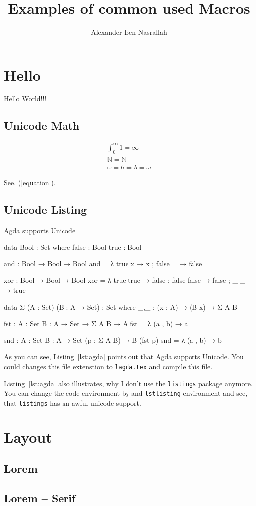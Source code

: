 \documentclass[titlepage,12pt]{article}
\author{Alexander Ben Nasrallah}
\title{Examples of common used Macros}
\begin{document}
\maketitle


\toc{}

\section{Hello}
Hello World!!!

\subsection{Unicode Math}
\begin{align}
	∫_0^∞ 1 = ∞ \\
	\mathbb{N} = ℕ \label{equation} \\
	ω = b ⇔ b = ω
\end{align}

See. (\ref{equation}).

\subsection{Unicode Listing}
\begin{listing}[H]
\caption{Agda supports Unicode}\label{lst:agda}
\begin{code}
data Bool : Set where
  false : Bool
  true  : Bool

and : Bool → Bool → Bool
and = λ { true x → x ; false _ → false }

xor : Bool → Bool → Bool
xor = λ { true  true  → false
        ; false false → false
        ; _     _     → true
        }

data Σ (A : Set) (B : A → Set) : Set where
  _,_ : (x : A) → (B x) → Σ A B

fst : {A : Set} {B : A → Set} → Σ A B → A
fst = λ { (a , b) → a }

snd : {A : Set} {B : A → Set} (p : Σ A B) → B (fst p)
snd = λ { (a , b) → b }
\end{code}
\end{listing}
As you can see, Listing~\ref{lst:agda} points out that Agda supports Unicode.
You could changes this file extenstion to \verb|lagda.tex| and compile this file.

Listing~\ref{lst:agda} also illustrates, why I don't use the \verb|listings| package anymore.
You can change the code environment by and \verb|lstlisting| environment and see, that
\verb|listings| has an awful unicode support.

\section{Layout}
\subsection{Lorem}
\lipsum[2-4]

\subsection{Lorem -- Serif}
\textrm{\lipsum[2-4]}

\clearpage
\listoflistings
\end{document}
